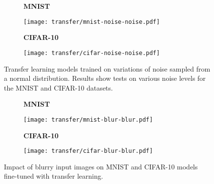 \documentclass[conference]{IEEEtran}
\begin{document}
\begin{figure}[H]
    \centering
    \begin{subfigure}[h]{0.30\textwidth}
        \centering
        \textbf{MNIST}\par\medskip
        \texttt{[image: transfer/mnist-noise-noise.pdf]}
        \caption{} 
        \label{fig:transfer-mnist-noise}
    \end{subfigure}
    \quad
    \begin{subfigure}[h]{0.30\textwidth}  
        \centering 
        \textbf{CIFAR-10}\par\medskip
        \texttt{[image: transfer/cifar-noise-noise.pdf]}
        \caption{} 
        \label{fig:transfer-cifar-noise}
    \end{subfigure}
    \captionsetup{width=0.80\linewidth}
    \caption{Transfer learning models trained on variations of noise sampled from a normal distribution. Results show tests on various noise levels for the MNIST and CIFAR-10 datasets.} 
    \label{fig:transfer-noise}
\end{figure}

\begin{figure}[H]
    \centering
    \begin{subfigure}[h]{0.30\textwidth}
        \centering
        \textbf{MNIST}\par\medskip
        \texttt{[image: transfer/mnist-blur-blur.pdf]}
        \caption{} 
        \label{fig:transfer-mnist-blur}
    \end{subfigure}
    \quad
    \begin{subfigure}[h]{0.30\textwidth}  
        \centering 
        \textbf{CIFAR-10}\par\medskip
        \texttt{[image: transfer/cifar-blur-blur.pdf]}
        \caption{} 
        \label{fig:transfer-cifar-blur}
    \end{subfigure}
    \captionsetup{width=0.80\linewidth}
    \caption{Impact of blurry input images on MNIST and CIFAR-10 models fine-tuned with transfer learning.} 
    \label{fig:transfer-blur}
\end{figure}
\end{document}
